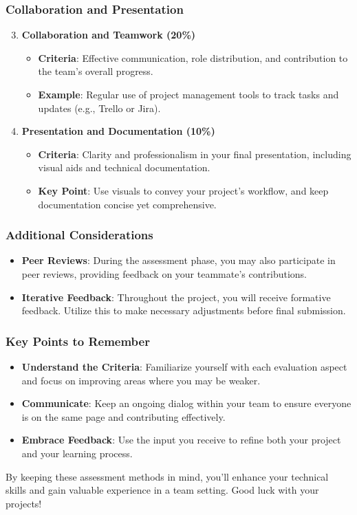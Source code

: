 \documentclass[aspectratio=169]{beamer}
\begin{document}
\begin{frame}
    \frametitle{Collaboration and Presentation}
    \begin{enumerate}
        \setcounter{enumi}{2}
        \item \textbf{Collaboration and Teamwork (20\%)}
            \begin{itemize}
                \item \textbf{Criteria}: Effective communication, role distribution, and contribution to the team's overall progress.
                \item \textbf{Example}: Regular use of project management tools to track tasks and updates (e.g., Trello or Jira).
            \end{itemize}
        
        \item \textbf{Presentation and Documentation (10\%)}
            \begin{itemize}
                \item \textbf{Criteria}: Clarity and professionalism in your final presentation, including visual aids and technical documentation.
                \item \textbf{Key Point}: Use visuals to convey your project’s workflow, and keep documentation concise yet comprehensive.
            \end{itemize}
    \end{enumerate}
\end{frame}

\begin{frame}
    \frametitle{Additional Considerations}
    \begin{itemize}
        \item \textbf{Peer Reviews}: During the assessment phase, you may also participate in peer reviews, providing feedback on your teammate's contributions.
        \item \textbf{Iterative Feedback}: Throughout the project, you will receive formative feedback. Utilize this to make necessary adjustments before final submission.
    \end{itemize}
\end{frame}

\begin{frame}
    \frametitle{Key Points to Remember}
    \begin{itemize}
        \item \textbf{Understand the Criteria}: Familiarize yourself with each evaluation aspect and focus on improving areas where you may be weaker.
        \item \textbf{Communicate}: Keep an ongoing dialog within your team to ensure everyone is on the same page and contributing effectively.
        \item \textbf{Embrace Feedback}: Use the input you receive to refine both your project and your learning process.
    \end{itemize}
    By keeping these assessment methods in mind, you’ll enhance your technical skills and gain valuable experience in a team setting. Good luck with your projects!
\end{frame}
\end{document}
